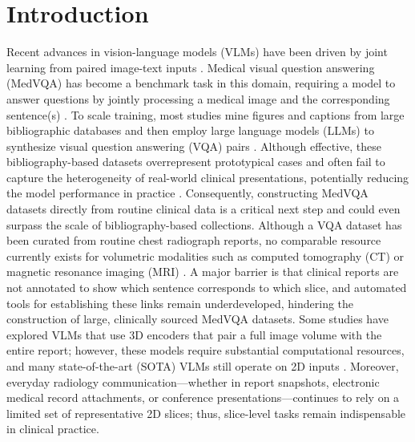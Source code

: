 \documentclass[bioengineering,article,submit,pdftex,moreauthors]{Definitions/mdpi}
\begin{document}
\section{Introduction}

Recent advances in vision-language models (VLMs) have been driven by joint learning from paired image-text inputs \cite{li_llava-next-interleave_2024,xiao_florence-2_2024,chen_internvl_2024,alayrac_flamingo_2022}. 
Medical visual question answering (MedVQA) has become a benchmark task in this domain, requiring a model to answer questions by jointly processing a medical image and the corresponding sentence(s) \cite{lau_dataset_2018,liu_slake_2021}. 
To scale training, most studies mine figures and captions from large bibliographic databases and then employ large language models (LLMs) to synthesize visual question answering (VQA) pairs \cite{zhang_pmc-vqa_2024,li_llava-med_2023}. 
Although effective, these bibliography-based datasets overrepresent prototypical cases and often fail to capture the heterogeneity of real-world clinical presentations, potentially reducing the model performance in practice \cite{zhang_pmc-vqa_2024,dong_generative_2025}. 
Consequently, constructing MedVQA datasets directly from routine clinical data is a critical next step and could even surpass the scale of bibliography-based collections. 
Although a VQA dataset has been curated from routine chest radiograph reports, no comparable resource currently exists for volumetric modalities such as computed tomography (CT) or magnetic resonance imaging (MRI) \cite{bae_ehrxqa_2024}. 
A major barrier is that clinical reports are not annotated to show which sentence corresponds to which slice, and automated tools for establishing these links remain underdeveloped, hindering the construction of large, clinically sourced MedVQA datasets. 
Some studies have explored VLMs that use 3D encoders that pair a full image volume with the entire report; however, these models require substantial computational resources, and many state-of-the-art (SOTA) VLMs still operate on 2D inputs \cite{bai_m3d_2024,blankemeier_merlin_2024,hamamci_ct2rep_2024}. 
Moreover, everyday radiology communication—whether in report snapshots, electronic medical record attachments, or conference presentations—continues to rely on a limited set of representative 2D slices; thus, slice-level tasks remain indispensable in clinical practice. 
\end{document}
